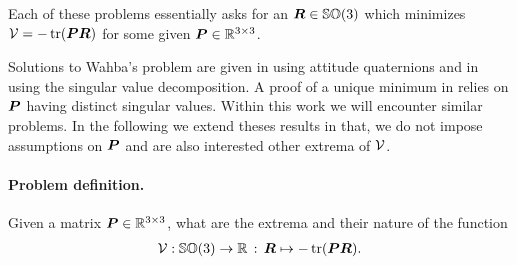 Each of these problems essentially asks for an $\boldsymbol{R}\in\mathbb{SO}(3)$ which minimizes $\mathcal{V} = -\operatorname{tr}(\boldsymbol{P} \boldsymbol{R})$ for some given $\boldsymbol{P}\in\mathbb{R}^{3\times3}$.

Solutions to Wahba's problem are given in \cite{Davenport:QMethod} using attitude quaternions and in \cite{Kabsch:SSVD} using the singular value decomposition.
A proof of a unique minimum in \cite{Bullo:TrackingAutomatica} relies on $\boldsymbol{P}$ having distinct singular values.
Within this work we will encounter similar problems.
In the following we extend theses results in that, we do not impose assumptions on $\boldsymbol{P}$ and are also interested other extrema of $\mathcal{V}$.

\paragraph{Problem definition.}
Given a matrix $\boldsymbol{P} \in \mathbb{R}^{3\times3}$, what are the extrema and their nature of the function
\begin{align}
 \mathcal{V}: \mathbb{SO}(3) \rightarrow \mathbb{R} \, : \, \boldsymbol{R} \mapsto -\operatorname{tr}(\boldsymbol{P} \boldsymbol{R}).
\end{align}


